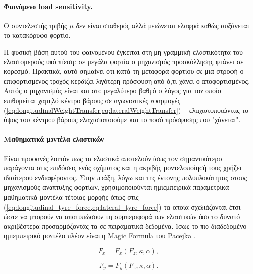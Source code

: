\paragraph{Φαινόμενο load sensitivity.}
Ο συντελεστής τριβής $\mu$ δεν είναι σταθερός αλλά μειώνεται ελαφρά καθώς αυξάνεται το
κατακόρυφο φορτίο.

Η φυσική βάση αυτού του φαινομένου έγκειται στη μη-γραμμική ελαστικότητα του ελαστομερούς
υπό πίεση: σε μεγάλα φορτία ο μηχανισμός προσκόλλησης φτάνει σε κορεσμό. Πρακτικά, αυτό σημαίνει
ότι κατά τη μεταφορά φορτίου σε μια στροφή ο επιφορτισμένος τροχός κερδίζει λιγότερη πρόσφυση
από ό,τι χάνει ο αποφορτισμένος. Αυτός ο μηχανισμός είναι και στο μεγαλύτερο βαθμό ο λόγος για τον
οποίο επιθυμείται χαμηλό κέντρο βάρους σε αγωνιστικές εφαρμογές (\cref{eq:longitudinalWeightTransfer,eq:lateralWeightTransfer})
-- ελαχιστοποιώντας το ύψος του κέντρου βάρους ελαχιστοποιούμε και το ποσό πρόσφυσης που "χάνεται".


\paragraph{Μαθηματικά μοντέλα ελαστικών}
Είναι προφανές λοιπόν πως τα ελαστικά αποτελούν ίσως τον σημαντικότερο
παράγοντα στις επιδόσεις ενός οχήματος και η ακριβής μοντελοποίησή τους
χρήζει ιδιαίτερου ενδιαφέροντος. Στην πράξη, λόγω και της έντονης πολυπλοκότητας
στους μηχανισμούς ανάπτυξης φορτίων, χρησιμοποιούνται ημιεμπειρικά παραμετρικά 
μαθηματικά μοντέλα τέτοιας μορφής όπως στις (\cref{eq:longitudinal_tyre_force,eq:lateral_tyre_force}) τα οποία σχεδιάζονται έτσι ώστε να μπορούν να αποτυπώσουν
τη συμπεριφορά των ελαστικών όσο το δυνατό ακριβέστερα προσαρμόζοντάς τα σε 
πειραματικά δεδομένα. Ίσως το πιο διαδεδομένο ημιεμπειρικό μοντέλο πλέον είναι
η Magic Formula του Pacejka \cite{Pacejka2012,Sakhnevych2022}.

\begin{equation}
F_x = F_x\left(F_z,\kappa,\alpha\right),
\label{eq:longitudinal_tyre_force}
\end{equation}

\begin{equation}
F_y = F_y\left(F_z,\kappa,\alpha\right).
\label{eq:lateral_tyre_force}
\end{equation}

